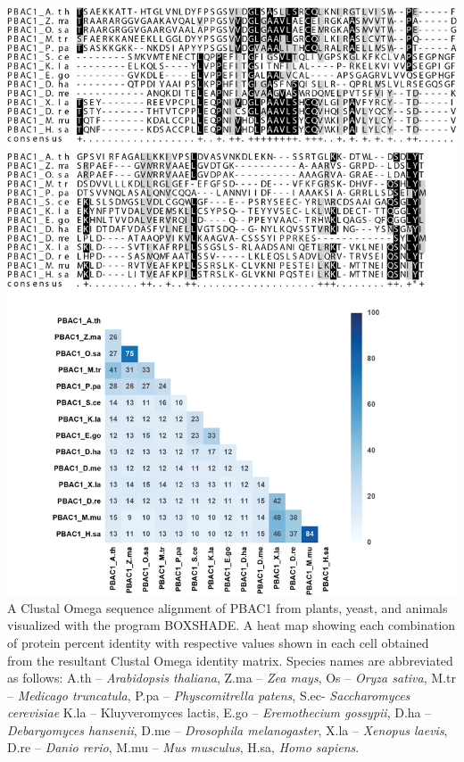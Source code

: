 \begin{FPfigure}
	\ContinuedFloat
	\centering
	\includegraphics[width=\columnwidth]{Proteasome/pbac1align2.png}
	{A Clustal Omega \citep{sievers14} sequence alignment of PBAC1 from plants, yeast, and animals visualized with the program BOXSHADE. A heat map showing each combination of protein percent identity with respective values shown in each cell obtained from the resultant Clustal Omega identity matrix. Species names are abbreviated as follows: A.th – \textit{Arabidopsis thaliana}, Z.ma – \textit{Zea mays}, Os – \textit{Oryza sativa}, M.tr – \textit{Medicago truncatula}, P.pa – \textit{Physcomitrella patens}, S.ec- \textit{Saccharomyces cerevisiae} K.la – {Kluyveromyces lactis}, E.go – \textit{Eremothecium gossypii}, D.ha – \textit{Debaryomyces hansenii}, D.me – \textit{Drosophila melanogaster}, X.la – \textit{Xenopus laevis}, D.re – \textit{Danio rerio}, M.mu – \textit{Mus musculus}, H.sa, \textit{Homo sapiens}.}
	\label{fig:pbac1align2}
\end{FPfigure}
